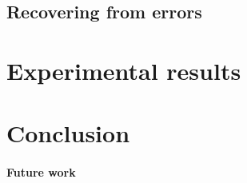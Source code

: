 \documentclass[twoside,a4paper]{article}
\begin{document}
\subsection{Recovering from errors}
\label{subsec:recovery}

\section{Experimental results}

\section{Conclusion}


\paragraph{Future work}






\end{document}
